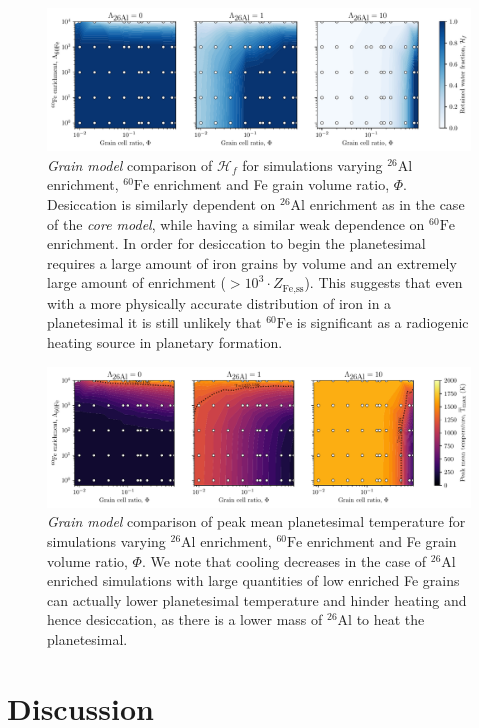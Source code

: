 \documentclass[fleqn,usenatbib]{mnras}
\newcommand{\rms}[1]{\ensuremath{_{\text{#1}}}}
\newcommand{\atom}[2]{$^{#2}\text{#1}$}
\newcommand{\al}{\atom{Al}{26}}
\newcommand{\fe}{\atom{Fe}{60}}
\newcommand{\waterfracHf}{\mathcal{H}_f}
\begin{document}
\begin{figure}
  \centering
  \includegraphics[scale=0.70]{assets/grain-model-phi/grain-water.pdf}
  \caption{\emph{Grain model} comparison of $\waterfracHf$ for simulations varying \al{} enrichment, \fe{} enrichment and Fe grain volume ratio, $\Phi$. Desiccation is similarly dependent on \al{} enrichment as in the case of the \emph{core model}, while having a similar weak dependence on \fe{} enrichment. In order for desiccation to begin the planetesimal requires a large amount of iron grains by volume and an extremely large amount of enrichment ($> 10^3 \cdot Z\rms{Fe,ss}$). This suggests that even with a more physically accurate distribution of iron in a planetesimal it is still unlikely that \fe{} is significant as a radiogenic heating source in planetary formation.}
  \label{fig:grain-model-phi-des}
\end{figure}

\begin{figure}
  \centering
  \includegraphics[scale=0.70]{assets/grain-model-phi/grain-temp.pdf}
  \caption{\emph{Grain model} comparison of peak mean planetesimal temperature for simulations varying \al{} enrichment, \fe{} enrichment and Fe grain volume ratio, $\Phi$. We note that cooling decreases in the case of \al{} enriched simulations with large quantities of low enriched Fe grains can actually lower planetesimal temperature and hinder heating and hence desiccation, as there is a lower mass of \al{} to heat the planetesimal.}
  \label{fig:grain-model-phi-temp}
\end{figure}


\section{Discussion}
\label{sec:discuss}
\end{document}
